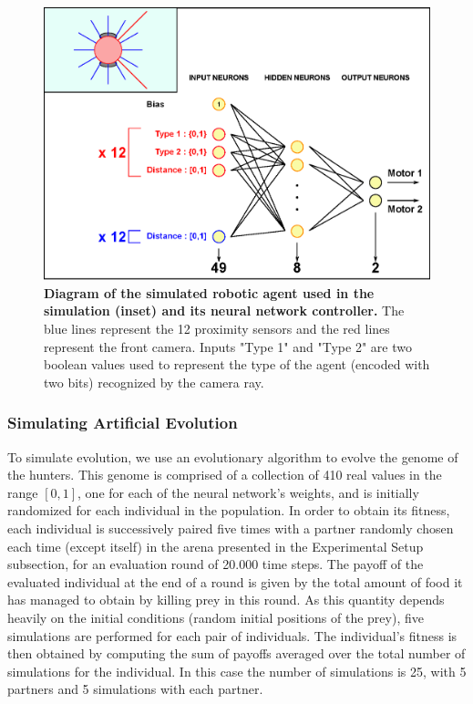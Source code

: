       \begin{figure}[hbtp]
        \centering
          \includegraphics[scale = 0.5]{fig/ArticleBio1/Fig2.eps}
          \caption{\textbf{Diagram of the simulated robotic agent used in the simulation (inset) and its neural network controller.}
          The blue lines represent the 12 proximity sensors and the red lines represent the front camera. Inputs "Type 1" and "Type 2" are two boolean values used to represent the type of the agent (encoded with two bits) recognized by the camera ray.}
        \label{fig:robotDescription}
      \end{figure}


    \subsubsection{Simulating Artificial Evolution} 
    \label{artificialEvolution}
      To simulate evolution, we use an evolutionary algorithm to evolve the genome of the hunters. This genome is comprised of a collection of 410 real values in the range \([0,1]\), one for each of the neural network's weights, and is initially randomized for each individual in the population. In order to obtain its fitness, each individual is successively paired five times with a partner randomly chosen each time (except itself) in the arena presented in the Experimental Setup subsection, for an evaluation round of 20.000 time steps. The payoff of the evaluated individual at the end of a round is given by the total amount of food it has managed to obtain by killing prey in this round. As this quantity depends heavily on the initial conditions (random initial positions of the prey), five simulations are performed for each pair of individuals. The individual's fitness is then obtained by computing the sum of payoffs averaged over the total number of simulations for the individual. In this case the number of simulations is 25, with 5 partners and 5 simulations with each partner.

